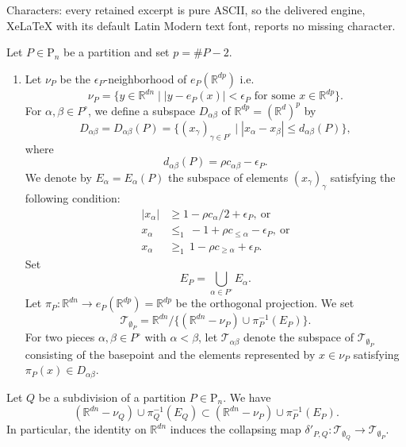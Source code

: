 \documentclass[10pt,a4paper]{amsart}
\newcommand{\PP}{\mathrm{P}} %
\newcommand{\RR}{\mathbb{R}}
\newcommand{\TT}{\mathcal{T}} %
\newcommand{\eps}{\epsilon}
\begin{document}
Characters: every retained excerpt is pure ASCII, so the delivered engine, XeLaTeX with its default Latin Modern text font, reports no missing character.
\begin{defi}\label{Dpartition} Let $P\in \PP_n$ be a partition and set $p=\# P-2$.
\begin{enumerate}




\item Let $\nu_{P}$ be the $\eps_P$-neighborhood of $e_P(\RR^{dp})$ i.e.
\[
\nu_P=\{y\in \RR^{dn}\mid |y-e_P(x)|<\eps_P \text{ for some } x\in \RR^{dp}\}.
\]  For  $\alpha, \beta\in P^\circ$,  we define a   subspace $D_{\alpha\beta}$ of $\RR^{dp}=(\RR^d)^p$ by
\[
D_{\alpha\beta}=D_{\alpha\beta}(P)=\{(x_\gamma)_{\gamma \in P^\circ} \mid |x_\alpha-x_\beta|\leq d_{\alpha\beta}(P)\}, 
\]
where 
\[
d_{\alpha\beta}(P)=\rho c_{\alpha \beta}-\eps_P.
\]
We denote by $E_{\alpha}=E_\alpha(P)$  the subspace of  elements $(x_\gamma)_\gamma$ satisfying the following condition:
\[
\begin{split}
|x_\alpha|& \geq 1-\rho c_\alpha/2+\eps_P,\  \text{or} \\
  x_\alpha&\leq_1\, -1+\rho c_{\leq \alpha}-\eps_P,\  \text{or} \\  x_\alpha&\geq_1\,  1-\rho c_{\geq \alpha}+\eps_P.
\end{split}
\] 
Set 
\[
E_P=\bigcup_{\alpha\in P^\circ}E_\alpha.
\] 
Let $\pi_P:\RR^{dn}\to e_P(\RR^{dp})=\RR^{dp}$ be the orthogonal projection. 
We set
\[
\TT_{\emptyset_P}=\RR^{dn}/\{(\RR^{dn}-\nu_P)\cup \pi_P^{-1}(E_P)\}.
\]
 For two pieces $\alpha, \beta\in P^\circ$ with $\alpha<\beta$, let $\TT_{\alpha\beta}$ denote the subspace of $\TT_{\emptyset_P}$ consisting of the basepoint and the elements represented by  $x\in \nu_P$ satisfying $\pi_P(x)\in D_{\alpha\beta}$.

\end{enumerate}
\end{defi}

\begin{lem}\label{Ldiagonal_bound}
Let $Q$ be a subdivision of a partition $P\in \PP_n$. We have
\[
(\RR^{dn}-\nu_Q)\cup \pi_Q^{-1}(E_Q)\subset (\RR^{dn}-\nu_P)\cup \pi_P^{-1}(E_P).
\]
In particular, the identity on $\RR^{dn}$ induces the collapsing map 
$\delta'_{P,Q}:\TT_{\emptyset_Q}\to \TT_{\emptyset_P}.
$
\end{lem}
\end{document}
